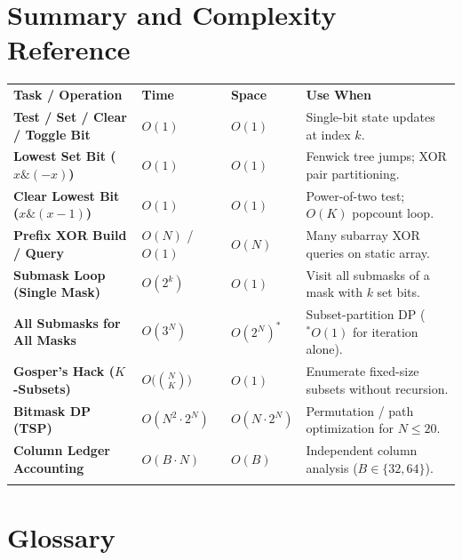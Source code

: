 \documentclass[11pt,a4paper]{article}
\theoremstyle{definition}
\begin{document}
\section{Summary and Complexity Reference}

\begingroup\small{}
\begin{tabularx}{\textwidth}{>{\raggedright\arraybackslash\bfseries}p{4.3cm} >{\centering\arraybackslash}p{2.0cm} >{\centering\arraybackslash}p{1.8cm} >{\raggedright\arraybackslash}X}
\arrayrulecolor{primaryblue}\toprule[1.2pt]
\rowcolor{primaryblue!10}
\textcolor{primaryblue}{\textbf{Task / Operation}} & \textcolor{primaryblue}{\textbf{Time}} & \textcolor{primaryblue}{\textbf{Space}} & \textcolor{primaryblue}{\textbf{Use When}} \\
\arrayrulecolor{codeframe}\midrule[0.6pt]
Test / Set / Clear / Toggle Bit & $O(1)$ & $O(1)$ & Single-bit state updates at index $k$. \\
Lowest Set Bit ($x \mathbin{\&} (-x)$) & $O(1)$ & $O(1)$ & Fenwick tree jumps; XOR pair partitioning. \\
Clear Lowest Bit ($x \mathbin{\&} (x{-}1)$) & $O(1)$ & $O(1)$ & Power-of-two test; $O(K)$ popcount loop. \\
Prefix XOR Build / Query & $O(N)$ / $O(1)$ & $O(N)$ & Many subarray XOR queries on static array. \\
Submask Loop (Single Mask) & $O(2^k)$ & $O(1)$ & Visit all submasks of a mask with $k$ set bits. \\
All Submasks for All Masks & $O(3^N)$ & $O(2^N)^*$ & Subset-partition DP ($^*O(1)$ for iteration alone). \\
Gosper's Hack ($K$-Subsets) & $O\big(\binom{N}{K}\big)$ & $O(1)$ & Enumerate fixed-size subsets without recursion. \\
Bitmask DP (TSP) & $O(N^2 \cdot 2^N)$ & $O(N \cdot 2^N)$ & Permutation / path optimization for $N \le 20$. \\
Column Ledger Accounting & $O(B \cdot N)$ & $O(B)$ & Independent column analysis ($B \in \{32, 64\}$). \\
\arrayrulecolor{primaryblue}\bottomrule[1.2pt]
\end{tabularx}\endgroup

\section{Glossary}
\end{document}
